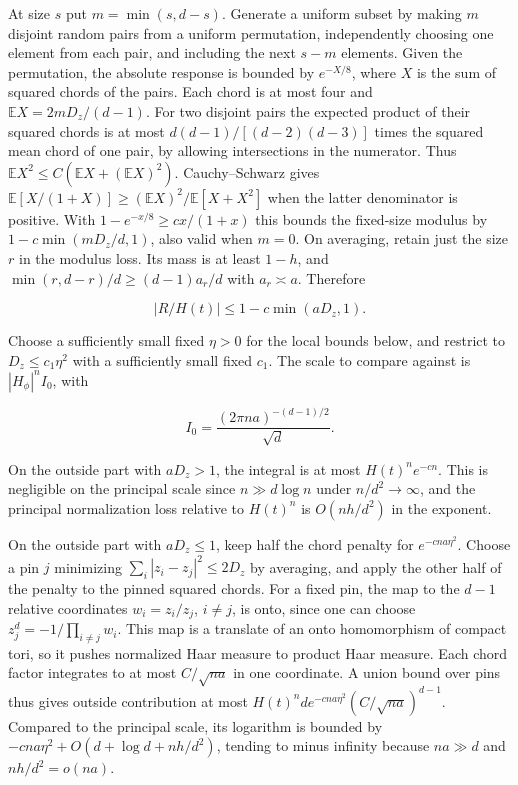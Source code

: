 At size $s$ put $m=\min(s,d-s)$. Generate a uniform subset by making $m$ disjoint random pairs from a uniform permutation, independently choosing one element from each pair, and including the next $s-m$ elements. Given the permutation, the absolute response is bounded by $e^{-X/8}$, where $X$ is the sum of squared chords of the pairs. Each chord is at most four and $\mathbb EX=2mD_z/(d-1)$. For two disjoint pairs the expected product of their squared chords is at most $d(d-1)/[(d-2)(d-3)]$ times the squared mean chord of one pair, by allowing intersections in the numerator. Thus $\mathbb EX^2\le C(\mathbb EX+(\mathbb EX)^2)$. Cauchy--Schwarz gives $\mathbb E[X/(1+X)]\ge(\mathbb EX)^2/\mathbb E[X+X^2]$ when the latter denominator is positive. With $1-e^{-x/8}\ge c x/(1+x)$ this bounds the fixed-size modulus by $1-c\min(mD_z/d,1)$, also valid when $m=0$. On averaging, retain just the size $r$ in the modulus loss. Its mass is at least $1-h$, and $\min(r,d-r)/d\ge (d-1)a_r/d$ with $a_r\asymp a$. Therefore

\begin{equation*}
|R/H(t)|\le 1-c\min(aD_z,1).
\end{equation*}

Choose a sufficiently small fixed $\eta>0$ for the local bounds below, and restrict to $D_z\le c_1\eta^2$ with a sufficiently small fixed $c_1$. The scale to compare against is $|H_\phi|^n I_0$, with

\begin{equation*}
I_0=\frac{(2\pi n a)^{-(d-1)/2}}{\sqrt d}.
\end{equation*}

On the outside part with $aD_z>1$, the integral is at most $H(t)^n e^{-cn}$. This is negligible on the principal scale since $n\gg d\log n$ under $n/d^2\to\infty$, and the principal normalization loss relative to $H(t)^n$ is $O(nh/d^2)$ in the exponent.

On the outside part with $aD_z\le1$, keep half the chord penalty for $e^{-cna\eta^2}$. Choose a pin $j$ minimizing $\sum_i|z_i-z_j|^2\le2D_z$ by averaging, and apply the other half of the penalty to the pinned squared chords. For a fixed pin, the map to the $d-1$ relative coordinates $w_i=z_i/z_j$, $i\ne j$, is onto, since one can choose $z_j^d=-1/\prod_{i\ne j}w_i$. This map is a translate of an onto homomorphism of compact tori, so it pushes normalized Haar measure to product Haar measure. Each chord factor integrates to at most $C/\sqrt{na}$ in one coordinate. A union bound over pins thus gives outside contribution at most $H(t)^n d e^{-cna\eta^2}(C/\sqrt{na})^{d-1}$. Compared to the principal scale, its logarithm is bounded by $-cna\eta^2+O(d+\log d+nh/d^2)$, tending to minus infinity because $na\gg d$ and $nh/d^2=o(na)$.

